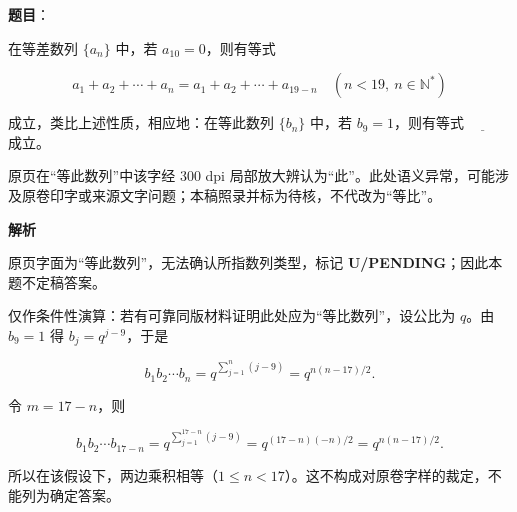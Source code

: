 \begin{answer}

\textbf{题目}：

在等差数列 $\{a_n\}$ 中，若 $a_{10}=0$，则有等式

\nopagebreak[4]
\[
a_1+a_2+\cdots+a_n=a_1+a_2+\cdots+a_{19-n}\quad(n<19,\ n\in\mathbb{N}^{*})
\]

成立，类比上述性质，相应地：在等此数列 $\{b_n\}$ 中，若 $b_9=1$，则有等式 $\underline{\qquad}$ 成立。

\begin{gktip}
原页在“等此数列”中该字经 300 dpi 局部放大辨认为“此”。此处语义异常，可能涉及原卷印字或来源文字问题；本稿照录并标为待核，不代改为“等比”。
\end{gktip}

\textbf{解析}

原页字面为“等此数列”，无法确认所指数列类型，标记 \textbf{U/PENDING}；因此本题不定稿答案。

仅作条件性演算：若有可靠同版材料证明此处应为“等比数列”，设公比为 $q$。由 $b_9=1$ 得 $b_j=q^{j-9}$，于是

\nopagebreak[4]
\[
b_1b_2\cdots b_n=q^{\sum_{j=1}^{n}(j-9)}=q^{n(n-17)/2}.
\]

令 $m=17-n$，则

\nopagebreak[4]
\[
b_1b_2\cdots b_{17-n}
=q^{\sum_{j=1}^{17-n}(j-9)}
=q^{(17-n)(-n)/2}
=q^{n(n-17)/2}.
\]

所以在该假设下，两边乘积相等（$1\leq n<17$）。这不构成对原卷字样的裁定，不能列为确定答案。


\end{answer}

